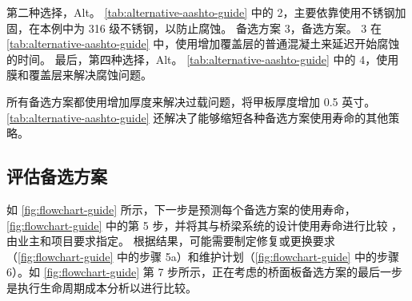 第二种选择，Alt。 \cref{tab:alternative-aashto-guide} 中的 2，主要依靠使用不锈钢加固，在本例中为 316 级不锈钢，以防止腐蚀。 备选方案 3，备选方案。 3 在 \cref{tab:alternative-aashto-guide} 中，使用增加覆盖层的普通混凝土来延迟开始腐蚀的时间。 最后，第四种选择，Alt。 \cref{tab:alternative-aashto-guide} 中的 4，使用膜和覆盖层来解决腐蚀问题。

所有备选方案都使用增加厚度来解决过载问题，将甲板厚度增加 0.5 英寸。\cref{tab:alternative-aashto-guide} 还解决了能够缩短各种备选方案使用寿命的其他策略。


\subsection{评估备选方案}
如 \cref{fig:flowchart-guide} 所示，下一步是预测每个备选方案的使用寿命，\cref{fig:flowchart-guide} 中的第 5 步，并将其与桥梁系统的设计使用寿命进行比较 ，由业主和项目要求指定。 根据结果，可能需要制定修复或更换要求（\cref{fig:flowchart-guide} 中的步骤 5a）和维护计划（\cref{fig:flowchart-guide} 中的步骤 6）。如 \cref{fig:flowchart-guide} 第 7 步所示，正在考虑的桥面板备选方案的最后一步是执行生命周期成本分析以进行比较。

